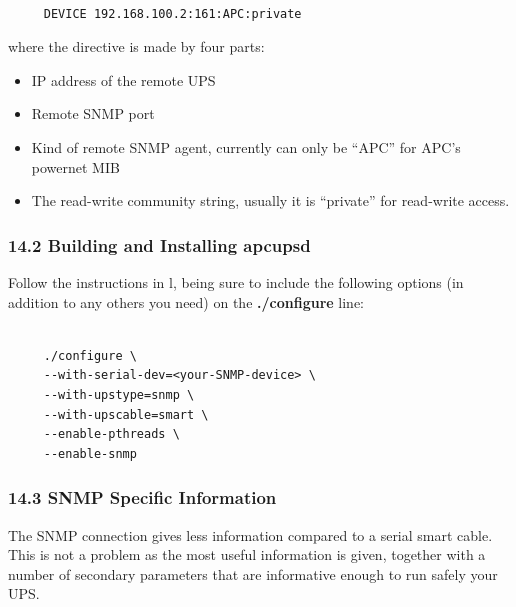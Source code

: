 {{{{{{{{{{\footnotesize
\begin{verbatim}
     
     DEVICE 192.168.100.2:161:APC:private
\end{verbatim}
\normalsize

where the directive is made by four parts:  

\begin{itemize}
\item IP address of the remote UPS  
\item Remote SNMP port  
\item Kind of remote SNMP agent, currently can only be ``APC'' for APC's
powernet MIB  
\item The read-write community string, usually it is ``private'' for
read-write access. 
\end{itemize}

\label{Building-and-Installing-apcupsd-_003c1_003e}

\subsubsection*{14.2 Building and Installing apcupsd}

Follow the instructions in 
l, being sure to include
the following options (in addition to any others you need) on the {\bf
./configure} line: 

\footnotesize
\begin{verbatim}
     
     ./configure \
     --with-serial-dev=<your-SNMP-device> \
     --with-upstype=snmp \
     --with-upscable=smart \
     --enable-pthreads \
     --enable-snmp
\end{verbatim}
\normalsize

\label{SNMP-Specific-Information}

\subsubsection*{14.3 SNMP Specific Information}

\label{index-SNMP-164}
The SNMP connection gives less information compared to a serial smart cable.
This is not a problem as the most useful information is given, together with a
number of secondary parameters that are informative enough to run safely your
UPS. 

}}}}}}}}}}
